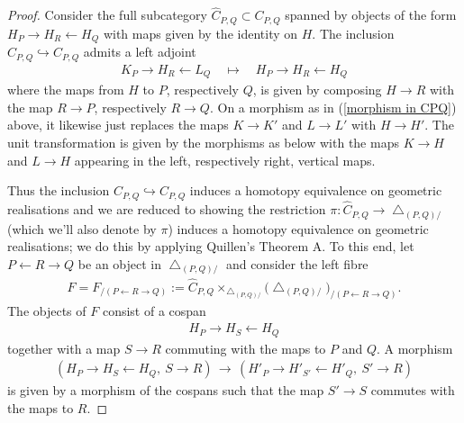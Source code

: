 \documentclass[12pt, reqno]{amsart}
\theoremstyle{plain}
\theoremstyle{definition}
\begin{document}
\begin{proof}
Consider the full subcategory $\hat{C}_{P,Q}\subset C_{P,Q}$ spanned by objects of the form $H_P\rightarrow H_R\leftarrow H_Q$ with maps given by the identity on $H$. The inclusion $\hat{C}_{P,Q}\hookrightarrow C_{P,Q}$ admits a left adjoint
\begin{align*}
K_P\rightarrow H_R\leftarrow L_Q\quad \mapsto \quad H_P\rightarrow H_R\leftarrow H_Q
\end{align*}
where the maps from $H$ to $P$, respectively $Q$, is given by composing $H\rightarrow R$ with the map $R\rightarrow P$, respectively $R\rightarrow Q$. On a morphism as in (\ref{morphism in CPQ}) above, it likewise just replaces the maps $K\rightarrow K'$ and $L\rightarrow L'$ with $H\rightarrow H'$. The unit transformation is given by the morphisms as below with the maps $K\rightarrow H$ and $L\rightarrow H$ appearing in the left, respectively right, vertical maps.
\begin{center}
\end{center}

Thus the inclusion $\hat{C}_{P,Q}\hookrightarrow C_{P,Q}$ induces a homotopy equivalence on geometric realisations and we are reduced to showing the restriction $\pi\colon \hat{C}_{P,Q}\rightarrow \bigtriangleup_{(P,Q)/}$ (which we'll also denote by $\pi$) induces a homotopy equivalence on geometric realisations; we do this by applying Quillen's Theorem A. To this end, let $P\leftarrow R\rightarrow Q$ be an object in $\bigtriangleup_{(P,Q)/}$ and consider the left fibre
\begin{align*}
F=F_{/(P\leftarrow R\rightarrow Q)}:=\hat{C}_{P,Q}\mathop{\times}_{\bigtriangleup_{(P,Q)/}} \big(\bigtriangleup_{(P,Q)/}\big)_{/(P\leftarrow R\rightarrow Q)}.
\end{align*}
The objects of $F$ consist of a cospan
\begin{align*}
H_P\rightarrow H_S\leftarrow H_Q
\end{align*}
together with a map $S\rightarrow R$ commuting with the maps to $P$ and $Q$. A morphism
\begin{align*}
(H_P\rightarrow H_S\leftarrow H_Q,\ S\rightarrow R)\,\longrightarrow\, (H'_P\rightarrow H'_{S'}\leftarrow H'_Q,\ S'\rightarrow R)
\end{align*}
is given by a morphism of the cospans such that the map $S'\rightarrow S$ commutes with the maps to $R$.


\end{proof}
\end{document}
